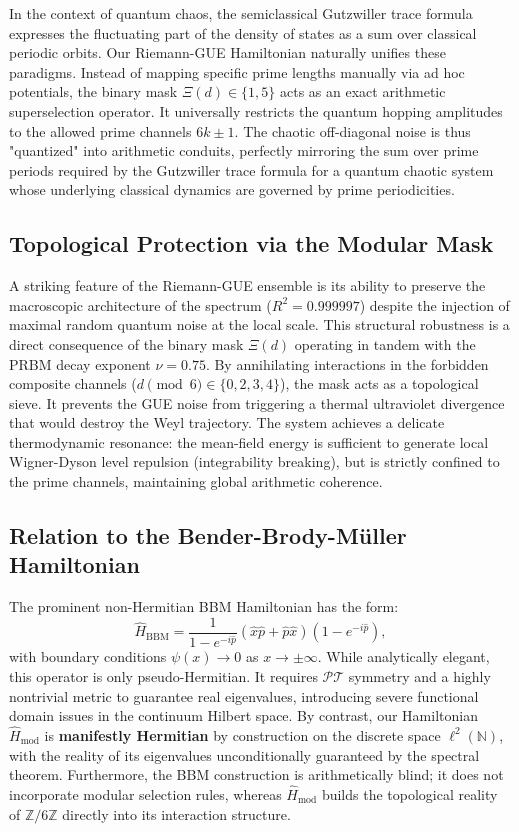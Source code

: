 \documentclass[prl,aps,floatfix,superscriptaddress,10pt]{revtex4-2}
\newcommand{\Zmod}{\mathbb{Z}/6\mathbb{Z}}
\begin{document}
In the context of quantum chaos, the semiclassical Gutzwiller trace formula expresses the fluctuating part of the density of states as a sum over classical periodic orbits. Our Riemann-GUE Hamiltonian naturally unifies these paradigms. Instead of mapping specific prime lengths manually via ad hoc potentials, the binary mask $\Xi(d) \in \{1,5\}$ acts as an exact arithmetic superselection operator. It universally restricts the quantum hopping amplitudes to the allowed prime channels $6k\pm1$. The chaotic off-diagonal noise is thus "quantized" into arithmetic conduits, perfectly mirroring the sum over prime periods required by the Gutzwiller trace formula for a quantum chaotic system whose underlying classical dynamics are governed by prime periodicities.

\subsection{Topological Protection via the Modular Mask}

A striking feature of the Riemann-GUE ensemble is its ability to preserve the macroscopic architecture of the spectrum ($R^2 = 0.999997$) despite the injection of maximal random quantum noise at the local scale.
This structural robustness is a direct consequence of the binary mask $\Xi(d)$ operating in tandem with the PRBM decay exponent $\nu = 0.75$.
By annihilating interactions in the forbidden composite channels ($d \pmod 6 \in \{0, 2, 3, 4\}$), the mask acts as a topological sieve. It prevents the GUE noise from triggering a thermal ultraviolet divergence that would destroy the Weyl trajectory. The system achieves a delicate thermodynamic resonance: the mean-field energy is sufficient to generate local Wigner-Dyson level repulsion (integrability breaking), but is strictly confined to the prime channels, maintaining global arithmetic coherence.

\subsection{Relation to the Bender-Brody-M\"uller Hamiltonian}

The prominent non-Hermitian BBM Hamiltonian \cite{Bender2017} has the form:
\begin{equation}
\hat{H}_{\text{BBM}} = \frac{1}{1 - e^{-i\hat{p}}} (\hat{x}\hat{p} + \hat{p}\hat{x}) (1 - e^{-i\hat{p}}),
\end{equation}
with boundary conditions $\psi(x) \to 0$ as $x \to \pm\infty$. While analytically elegant, this operator is only pseudo-Hermitian. It requires $\mathcal{PT}$ symmetry and a highly nontrivial metric to guarantee real eigenvalues, introducing severe functional domain issues in the continuum Hilbert space. By contrast, our Hamiltonian $\hat{H}_{\text{mod}}$ is \textbf{manifestly Hermitian} by construction on the discrete space $\ell^2(\mathbb{N})$, with the reality of its eigenvalues unconditionally guaranteed by the spectral theorem. Furthermore, the BBM construction is arithmetically blind; it does not incorporate modular selection rules, whereas $\hat{H}_{\text{mod}}$ builds the topological reality of $\Zmod$ directly into its interaction structure.
\end{document}
